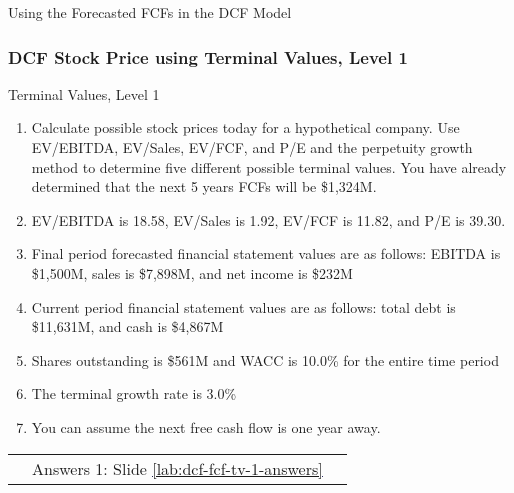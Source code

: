 \documentclass[handout, 11pt]{beamer}
\begin{document}
\begin{section}[Valuation]{Using the Forecasted FCFs in the DCF Model}
\begin{frame}
\end{frame}
\begin{frame}
\frametitle{DCF Stock Price using Terminal Values, Level 1}
{
\begin{block}{Terminal Values, Level 1}
\begin{enumerate}
\small
\item Calculate possible stock prices today for a hypothetical company. Use EV/EBITDA, EV/Sales, EV/FCF, and P/E and the perpetuity growth method to determine five different possible terminal values. You have already determined that the next 5 years FCFs will be \$1,324M. 
\item EV/EBITDA is 18.58, EV/Sales is 1.92, EV/FCF is 11.82, and P/E is 39.30.
\item Final period forecasted financial statement values are as follows: EBITDA is \$1,500M, sales is \$7,898M, and net income is \$232M
\item Current period financial statement values are as follows: total debt is \$11,631M, and cash is \$4,867M
\item Shares outstanding is \$561M and WACC is 10.0\% for the entire time period
\item The terminal growth rate is 3.0\%
\item You can assume the next free cash flow is one year away.
\end{enumerate}
\vfill
\begin{tabular*}{\textwidth}{@{\extracolsep{\fill}}ccc}
\toprule
\hfill & Answers 1: Slide \textcolor{blue}{\underline{\ref{lab:dcf-fcf-tv-1-answers}}} & \hfill\\

\end{tabular*}
\end{block}
}
\label{lab:dcf-fcf-tv-1}
\end{frame}
\end{section}
\appendix
{}
\setcounter{finalframe}{\value{framenumber}}
\end{document}
